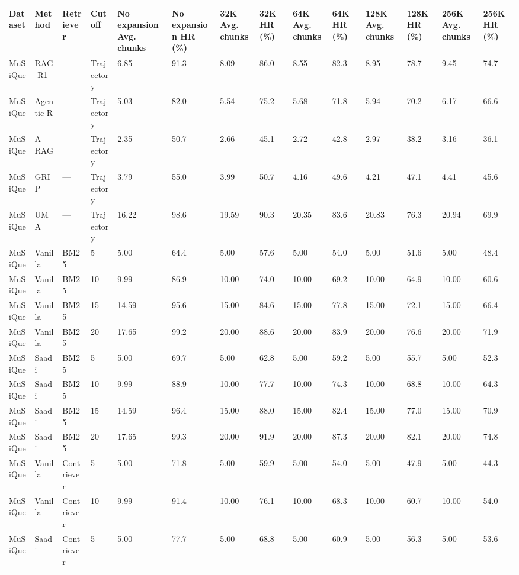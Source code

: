 \begin{tabular}{llllllllllllll}
\hline
Dataset & Method & Retriever & Cutoff & No expansion Avg. chunks & No expansion HR (\%) & 32K Avg. chunks & 32K HR (\%) & 64K Avg. chunks & 64K HR (\%) & 128K Avg. chunks & 128K HR (\%) & 256K Avg. chunks & 256K HR (\%) \\
\hline
MuSiQue & RAG-R1 & — & Trajectory & 6.85 & 91.3 & 8.09 & 86.0 & 8.55 & 82.3 & 8.95 & 78.7 & 9.45 & 74.7 \\
MuSiQue & Agentic-R & — & Trajectory & 5.03 & 82.0 & 5.54 & 75.2 & 5.68 & 71.8 & 5.94 & 70.2 & 6.17 & 66.6 \\
MuSiQue & A-RAG & — & Trajectory & 2.35 & 50.7 & 2.66 & 45.1 & 2.72 & 42.8 & 2.97 & 38.2 & 3.16 & 36.1 \\
MuSiQue & GRIP & — & Trajectory & 3.79 & 55.0 & 3.99 & 50.7 & 4.16 & 49.6 & 4.21 & 47.1 & 4.41 & 45.6 \\
MuSiQue & UMA & — & Trajectory & 16.22 & 98.6 & 19.59 & 90.3 & 20.35 & 83.6 & 20.83 & 76.3 & 20.94 & 69.9 \\
MuSiQue & Vanilla & BM25 & 5 & 5.00 & 64.4 & 5.00 & 57.6 & 5.00 & 54.0 & 5.00 & 51.6 & 5.00 & 48.4 \\
MuSiQue & Vanilla & BM25 & 10 & 9.99 & 86.9 & 10.00 & 74.0 & 10.00 & 69.2 & 10.00 & 64.9 & 10.00 & 60.6 \\
MuSiQue & Vanilla & BM25 & 15 & 14.59 & 95.6 & 15.00 & 84.6 & 15.00 & 77.8 & 15.00 & 72.1 & 15.00 & 66.4 \\
MuSiQue & Vanilla & BM25 & 20 & 17.65 & 99.2 & 20.00 & 88.6 & 20.00 & 83.9 & 20.00 & 76.6 & 20.00 & 71.9 \\
MuSiQue & Saadi & BM25 & 5 & 5.00 & 69.7 & 5.00 & 62.8 & 5.00 & 59.2 & 5.00 & 55.7 & 5.00 & 52.3 \\
MuSiQue & Saadi & BM25 & 10 & 9.99 & 88.9 & 10.00 & 77.7 & 10.00 & 74.3 & 10.00 & 68.8 & 10.00 & 64.3 \\
MuSiQue & Saadi & BM25 & 15 & 14.59 & 96.4 & 15.00 & 88.0 & 15.00 & 82.4 & 15.00 & 77.0 & 15.00 & 70.9 \\
MuSiQue & Saadi & BM25 & 20 & 17.65 & 99.3 & 20.00 & 91.9 & 20.00 & 87.3 & 20.00 & 82.1 & 20.00 & 74.8 \\
MuSiQue & Vanilla & Contriever & 5 & 5.00 & 71.8 & 5.00 & 59.9 & 5.00 & 54.0 & 5.00 & 47.9 & 5.00 & 44.3 \\
MuSiQue & Vanilla & Contriever & 10 & 9.99 & 91.4 & 10.00 & 76.1 & 10.00 & 68.3 & 10.00 & 60.7 & 10.00 & 54.0 \\
MuSiQue & Saadi & Contriever & 5 & 5.00 & 77.7 & 5.00 & 68.8 & 5.00 & 60.9 & 5.00 & 56.3 & 5.00 & 53.6 \\

\end{tabular}
